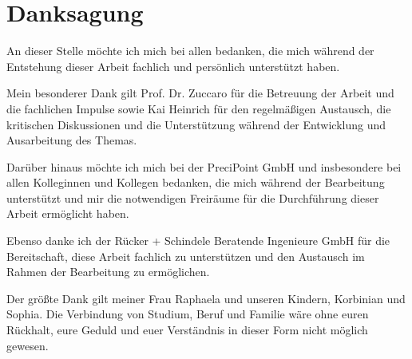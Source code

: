 \section*{Danksagung}
{}

An dieser Stelle möchte ich mich bei allen bedanken, die mich während der
Entstehung dieser Arbeit fachlich und persönlich unterstützt haben.

Mein besonderer Dank gilt Prof. Dr. Zuccaro für die Betreuung der Arbeit und
die fachlichen Impulse sowie Kai Heinrich für den regelmäßigen Austausch, die
kritischen Diskussionen und die Unterstützung während der Entwicklung und
Ausarbeitung des Themas.

Darüber hinaus möchte ich mich bei der PreciPoint GmbH und insbesondere bei
allen Kolleginnen und Kollegen bedanken, die mich während der Bearbeitung
unterstützt und mir die notwendigen Freiräume für die Durchführung dieser Arbeit
ermöglicht haben.

Ebenso danke ich der Rücker + Schindele Beratende Ingenieure GmbH für die
Bereitschaft, diese Arbeit fachlich zu unterstützen und den Austausch im Rahmen
der Bearbeitung zu ermöglichen.

Der größte Dank gilt meiner Frau Raphaela und unseren Kindern, Korbinian und
Sophia. Die Verbindung von Studium, Beruf und Familie wäre ohne euren
Rückhalt, eure Geduld und euer Verständnis in dieser Form nicht möglich
gewesen.